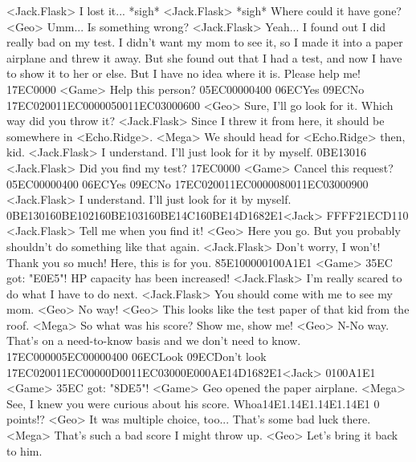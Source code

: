 <Jack.Flask> I lost it... *sigh* 
<Jack.Flask> *sigh* Where could it have gone? 
<Geo> Umm... 
Is something wrong? 
<Jack.Flask> Yeah... I found out I did really bad on my test. 
I didn't want my mom to see it, so I made it into a paper airplane and threw it away. 
But she found out that I had a test, and now I have to show it to her or else. 
But I have no idea where it is. 
Please help me! 
{17}{EC}{00}{00} 
<Game> Help this person? {05}{EC}{00}{00}{04}{00}  {06}{EC}Yes   {09}{EC}No 
{17}{EC}{02}{00}{11}{EC}{00}{00}{05}{00}{11}{EC}{03}{00}{06}{00}
<Geo> Sure, I'll go look for it. 
Which way did you throw it? 
<Jack.Flask> Since I threw it from here, it should be somewhere in <Echo.Ridge>. 
<Mega> We should head for <Echo.Ridge> then, kid. 
<Jack.Flask> I understand. I'll just look for it by myself. 
{0B}{E1}{30}{16}
<Jack.Flask> Did you find my test? 
{17}{EC}{00}{00} 
<Game> Cancel this request? {05}{EC}{00}{00}{04}{00}  {06}{EC}Yes   {09}{EC}No 
{17}{EC}{02}{00}{11}{EC}{00}{00}{08}{00}{11}{EC}{03}{00}{09}{00}
<Jack.Flask> I understand. I'll just look for it by myself. 
{0B}{E1}{30}{16}{0B}{E1}{02}{16}{0B}{E1}{03}{16}{0B}{E1}{4C}{16}{0B}{E1}{4D}{16}{82}{E1}<Jack> {FF}{FF}{21}{EC}{D1}{10}
<Jack.Flask> Tell me when you find it! 
<Geo> Here you go. 
But you probably shouldn't do something like that again. 
<Jack.Flask> Don't worry, I won't! Thank you so much! Here, this is for you. 
{85}{E1}{00}{00}{01}{00}{A1}{E1} 
<Game> {35}{EC} got: "{E0}{E5}"! 
HP capacity has been increased! 
<Jack.Flask> I'm really scared to do what I have to do next. 
<Jack.Flask> You should come with me to see my mom. 
<Geo> No way! 
<Geo> This looks like the test paper of that kid from the roof. 
<Mega> So what was his score? Show me, show me! 
<Geo> N-No way. That's on a need-to-know basis and we don't need to know. 
{17}{EC}{00}{00}{05}{EC}{00}{00}{04}{00}  {06}{EC}Look   {09}{EC}Don't look 
{17}{EC}{02}{00}{11}{EC}{00}{00}{0D}{00}{11}{EC}{03}{00}{0E}{00}{0A}{E1}{4D}{16}{82}{E1}<Jack> {01}{00}{A1}{E1} 
<Game> {35}{EC} got: "{8D}{E5}"! 
<Game> Geo opened the paper airplane. 
<Mega> See, I knew you were curious about his score. 
Whoa{14}{E1}.{14}{E1}.{14}{E1}.{14}{E1} 0 points!? 
<Geo> It was multiple choice, too... 
That's some bad luck there. 
<Mega> That's such a bad score I might throw up. 
<Geo> Let's bring it back to him. 
